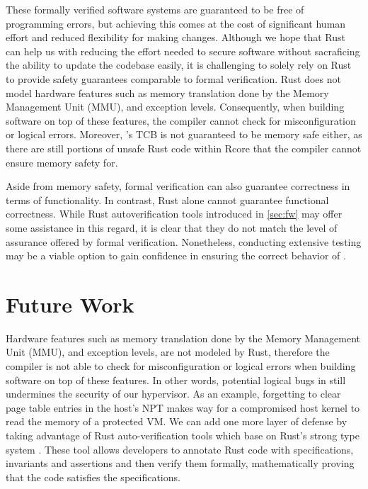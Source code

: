 These formally verified software systems are guaranteed to be free of
programming errors, but achieving this comes at the cost of significant human
effort and reduced flexibility for making changes.
Although we hope that Rust can help us with reducing the effort needed to secure
software without sacraficing the ability to update the codebase easily,
it is challenging to solely rely on Rust to provide safety guarantees
comparable to formal verification. Rust does not model hardware features
such as memory translation done by the Memory Management Unit (MMU), and
exception levels. Consequently, when building software on top of these features,
the compiler cannot check for misconfiguration or logical errors.
Moreover, \rustsec{}'s TCB \rustcore{} is not guaranteed to be memory safe either,
as there are still portions of unsafe Rust code
within Rcore that the compiler cannot ensure memory safety for.

Aside from memory safety, formal verification can also guarantee correctness in
terms of functionality.
In contrast, Rust alone cannot guarantee functional correctness. While Rust
autoverification tools introduced in \autoref{sec:fw} may offer some assistance
in this regard, it is clear that they do not match the level of assurance
offered by formal verification.
Nonetheless, conducting extensive testing may be a viable option to gain
confidence in ensuring the correct behavior of \rustcore{}.

\section{Future Work}
\label{sec:fw}

Hardware features such as memory translation done by the Memory Management
Unit (MMU), and exception levels, are not modeled by Rust, therefore the
compiler is not able to check for misconfiguration or logical errors when
building software on top of these features.
In other words, potential logical bugs in \rustcore{} still undermines the
security of our hypervisor.
As an example, forgetting to clear page table entries in the host's NPT
makes way for a compromised host kernel to read the memory of a protected VM.
We can add one more layer of defense by taking advantage of Rust
auto-verification tools which base on Rust's strong type system
\cite{Verus, Prusti, Creusot, Flux}. These tool allows developers to annotate
Rust code with specifications, invariants and assertions and then verify them
formally, mathematically proving that the code satisfies the specifications.

